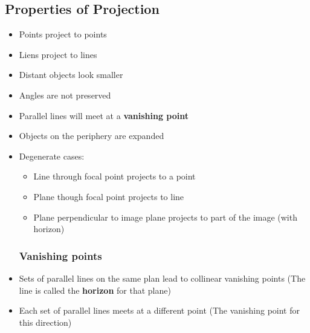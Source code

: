 \subsection{Properties of Projection}
\begin{itemize}
	\item Points project to points
	\item Liens project to lines
	\item Distant objects look smaller
	\item Angles are not preserved
	\item Parallel lines will meet at a \textbf{vanishing point}
	\item Objects on the periphery are expanded
	\item Degenerate cases:
	\begin{itemize}
		\item Line through focal point projects to a point
		\item Plane though focal point projects to line
		\item Plane perpendicular to image plane projects to part of the image (with horizon)
	\end{itemize}
\subsubsection{Vanishing points}
	\item Sets of parallel lines on the same plan lead to collinear vanishing points (The line is called the \textbf{horizon} for that plane)
	\item Each set of parallel lines meets at a different point (The vanishing point for this direction)
\end{itemize}

